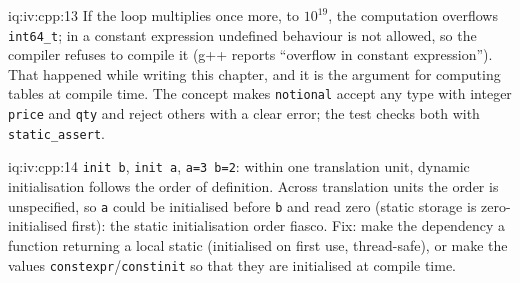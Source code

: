 \begin{solution}{iq:iv:cpp:13}
\label{lst:iv:cpp:constexpr}
If the loop multiplies once more, to $10^{19}$, the computation overflows \texttt{int64\_t}; in a constant expression undefined
behaviour is not allowed, so the compiler refuses to compile it (g++ reports ``overflow in constant expression''). That happened
while writing this chapter, and it is the argument for computing tables at compile time. The concept makes \texttt{notional} accept
any type with integer \texttt{price} and \texttt{qty} and reject others with a clear error; the test checks both with
\texttt{static\_assert}.
\end{solution}

\begin{solution}{iq:iv:cpp:14}
\texttt{init b}, \texttt{init a}, \texttt{a=3 b=2}: within one translation unit, dynamic initialisation follows the order of
definition. Across translation units the order is unspecified, so \texttt{a} could be initialised before \texttt{b} and read
zero (static storage is zero-initialised first): the static initialisation order fiasco. Fix: make the dependency a function
returning a local static (initialised on first use, thread-safe), or make the values \texttt{constexpr}/\texttt{constinit} so that
they are initialised at compile time.
\end{solution}
